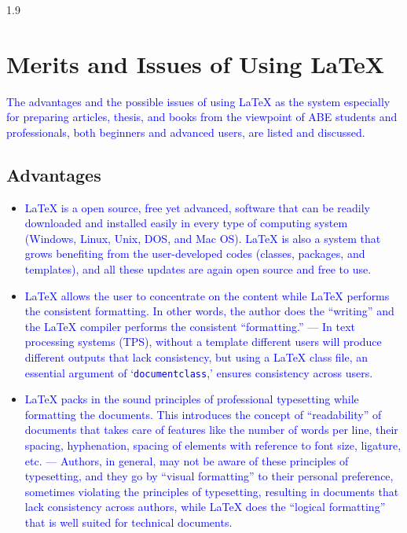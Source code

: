 \documentclass[phd]{ndsu-thesis-2022}
\newcommand\myspacing{1.9}      %
\newcommand\italk[1]{\textcolor{blue}{#1}}  %
\newcommand\lx{\LaTeX\xspace}
\newcommand\vb[1]{\textcolor{blue}{\texttt{#1}}}%
\begin{document}
\begin{spacing}{\myspacing}
\section{Merits and Issues of Using \lx}
\italk{The advantages and the possible issues of using \lx as the system especially for preparing articles, thesis, and books from the viewpoint of ABE students and professionals, both beginners and advanced users, are listed and discussed.} 

\subsection{Advantages}
\begin{itemize}[leftmargin=*, itemsep=0pt, parsep=3pt] 

\item \italk{\lx is a open source, free yet advanced, software that can be readily downloaded and installed easily in every type of computing system (Windows, Linux, Unix, DOS, and Mac OS). \lx is also a system that grows benefiting from the user-developed codes (classes, packages, and templates), and all these updates are again open source and free to use.}  

\item \italk{\lx allows the user to concentrate on the content while \lx performs the consistent formatting. In other words, the author does the ``writing'' and the \lx compiler performs the consistent ``formatting.'' --- In text processing systems (TPS), without a template different users will produce different outputs that lack consistency, but using a \lx class file, an essential argument of `\vb{documentclass},' ensures consistency across users.}  

\item \italk{\lx packs in the sound principles of professional typesetting while formatting the documents. This introduces the concept of ``readability'' of documents that takes care of features like the number of words per line, their spacing, hyphenation, spacing of elements with reference to font size, ligature, etc. --- Authors, in general, may not be aware of these principles of typesetting, and they go by ``visual formatting'' to their personal preference, sometimes violating the principles of typesetting, resulting in documents that lack consistency across authors, while \lx does the ``logical formatting'' that is well suited for technical documents.} 


\end{itemize}
\end{spacing}
\end{document}

